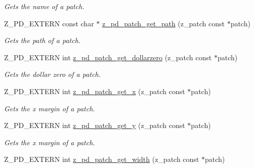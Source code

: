 \begin{DoxyCompactItemize}
\begin{DoxyCompactList}\small\item\em Gets the name of a patch. \end{DoxyCompactList}\item 
\hypertarget{group__zpd_ga85016cb3129a913720a63e26c1af4e9b}{Z\-\_\-\-P\-D\-\_\-\-E\-X\-T\-E\-R\-N const char $\ast$ \hyperlink{group__zpd_ga85016cb3129a913720a63e26c1af4e9b}{z\-\_\-pd\-\_\-patch\-\_\-get\-\_\-path} (z\-\_\-patch const $\ast$patch)}\label{group__zpd_ga85016cb3129a913720a63e26c1af4e9b}

\begin{DoxyCompactList}\small\item\em Gets the path of a patch. \end{DoxyCompactList}\item 
\hypertarget{group__zpd_ga246d4fac45cf72a6abcf49ca64938054}{Z\-\_\-\-P\-D\-\_\-\-E\-X\-T\-E\-R\-N int \hyperlink{group__zpd_ga246d4fac45cf72a6abcf49ca64938054}{z\-\_\-pd\-\_\-patch\-\_\-get\-\_\-dollarzero} (z\-\_\-patch const $\ast$patch)}\label{group__zpd_ga246d4fac45cf72a6abcf49ca64938054}

\begin{DoxyCompactList}\small\item\em Gets the dollar zero of a patch. \end{DoxyCompactList}\item 
\hypertarget{group__zpd_gaa053909248fc89f642275f8779d40b14}{Z\-\_\-\-P\-D\-\_\-\-E\-X\-T\-E\-R\-N int \hyperlink{group__zpd_gaa053909248fc89f642275f8779d40b14}{z\-\_\-pd\-\_\-patch\-\_\-get\-\_\-x} (z\-\_\-patch const $\ast$patch)}\label{group__zpd_gaa053909248fc89f642275f8779d40b14}

\begin{DoxyCompactList}\small\item\em Gets the x margin of a patch. \end{DoxyCompactList}\item 
\hypertarget{group__zpd_ga670de2f9761b9b01d5a22e0a8860a7c6}{Z\-\_\-\-P\-D\-\_\-\-E\-X\-T\-E\-R\-N int \hyperlink{group__zpd_ga670de2f9761b9b01d5a22e0a8860a7c6}{z\-\_\-pd\-\_\-patch\-\_\-get\-\_\-y} (z\-\_\-patch const $\ast$patch)}\label{group__zpd_ga670de2f9761b9b01d5a22e0a8860a7c6}

\begin{DoxyCompactList}\small\item\em Gets the x margin of a patch. \end{DoxyCompactList}\item 
\hypertarget{group__zpd_gaf46873ab63bb552df2f16861de6ac342}{Z\-\_\-\-P\-D\-\_\-\-E\-X\-T\-E\-R\-N int \hyperlink{group__zpd_gaf46873ab63bb552df2f16861de6ac342}{z\-\_\-pd\-\_\-patch\-\_\-get\-\_\-width} (z\-\_\-patch const $\ast$patch)}\label{group__zpd_gaf46873ab63bb552df2f16861de6ac342}


\end{DoxyCompactItemize}
